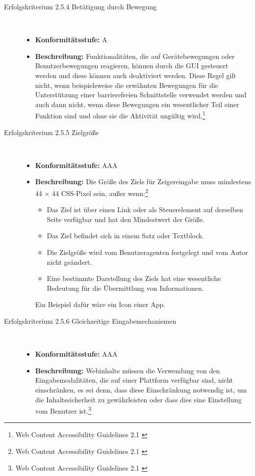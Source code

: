 \begin{description}
\begin{description}
		\item [Erfolgskriterium 2.5.4 Betätigung durch Bewegung]\hfill \\
		\begin{itemize}
			\item \textbf{Konformitätsstufe:} A
			\item \textbf{Beschreibung:} Funktionalitäten, die auf Gerätebewegungen oder Benutzerbewegungen reagieren, können durch die \ac{GUI} gesteuert werden und diese können auch 
			deaktiviert werden. Diese Regel gilt nicht, wenn beispielsweise die erwähnten Bewegungen für die Unterstützung einer barrierefreien Schnittstelle verwendet werden 
			und auch dann nicht, wenn diese Bewegungen ein wesentlicher Teil einer Funktion sind und ohne sie die Aktivität ungültig 
			wird.\footnote{Web Content Accessibility Guidelines 2.1 \cite{WCAG2.1}}
		\end{itemize}
		
		\item [Erfolgskriterium 2.5.5 Zielgröße]\hfill \\
		\begin{itemize}
			\item \textbf{Konformitätsstufe:} AAA
			\item \textbf{Beschreibung:} Die Größe des Ziels für Zeigereingabe muss mindestens 44 $\times$ 44 CSS-Pixel sein, außer 
			wenn:\footnote{Web Content Accessibility Guidelines 2.1 \cite{WCAG2.1}}
			\begin{itemize}
				\item Das Ziel ist über einen Link oder als Steuerelement auf derselben Seite verfügbar und hat den Mindestwert der Größe.
				\item Das Ziel befindet sich in einem Satz oder Textblock.
				\item Die Zielgröße wird vom Benutzeragenten festgelegt und vom Autor nicht geändert.
				\item Eine bestimmte Darstellung des Ziels hat eine wesentliche Bedeutung für die Übermittlung von Informationen.
			\end{itemize}
			
			Ein Beispiel dafür wäre ein Icon einer App.
		\end{itemize}
		
		\item [Erfolgskriterium 2.5.6 Gleichzeitige Eingabemechanismen]\hfill \\
		\begin{itemize}
			\item \textbf{Konformitätsstufe:} AAA
			\item \textbf{Beschreibung:} Webinhalte müssen die Verwendung von den Eingabemodalitäten, die auf einer Plattform verfügbar sind, nicht einschränken, es sei denn, dass 
			diese Einschränkung notwendig ist, um die Inhaltssicherheit zu gewährleisten oder dass dies eine Einstellung vom Benutzer 
			ist.\footnote{Web Content Accessibility Guidelines 2.1 \cite{WCAG2.1}}
		\end{itemize}
	\end{description}		


\end{description}
